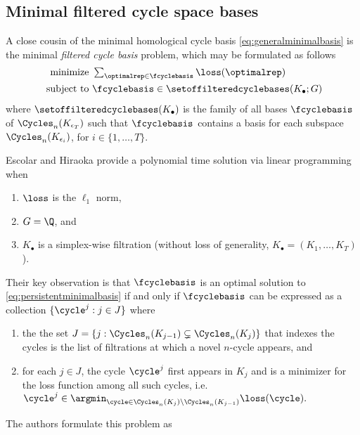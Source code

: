 \subsection{Minimal filtered cycle space bases}

A close cousin of the minimal homological cycle basis \pr \eqref{eq:generalminimalbasis} is the minimal \emph{filtered cycle basis} problem, which may be formulated as  follows
\begin{align}
   \begin{split}
    \text{minimize } & \textstyle \sum_{\optimalrep \in \fcyclebasis} \loss(\optimalrep) \\
    \text{ subject to } & \fcyclebasis \in \setoffilteredcyclebases(K_\bullet ; G)
   \end{split}
   \label{eq:filteredminimalbasis}
\end{align}
where $\setoffilteredcyclebases(K_\bullet)$ is the family of all bases $\fcyclebasis$ of $\Cycles_n(K_{\epsilon_T})$ such that $\fcyclebasis$ contains a basis for each  subspace $\Cycles_n(K_{\epsilon_i})$, for $i \in \{1, \ldots, T\}$. %

Escolar and Hiraoka \cite{Escolar2016} provide a polynomial time solution via linear programming when
    \begin{enumerate}
        \item $\loss$ is the $\ell_1$ norm,
        \item $G = \Q$, and
        \item $K_\bullet$ is a simplex-wise filtration (without loss of generality, $K_\bullet = (K_1, \ldots, K_T)$).
    \end{enumerate}
    
Their key observation is that $\fcyclebasis$ is an optimal solution to \pr \eqref{eq:persistentminimalbasis} if and only if $\fcyclebasis$ can be expressed as a collection $\{\cycle^j : j \in J\}$ where  \begin{enumerate}
    \item the the set $J = \{j :  \Cycles_n(K_{j-1}) \subsetneq \Cycles_n(K_j) \}$ that indexes the cycles is the list of filtrations at which a novel $n$-cycle appears, and
    \item for each $j \in J$, the cycle $\cycle^j$ first appears in $K_j$ and is a minimizer for the loss function among all such cycles, i.e. $\cycle^j \in \argmin_{\cycle \in \Cycles_n(K_j) \backslash \Cycles_n(K_{j-1})} \loss(\cycle).$
\end{enumerate}
The authors formulate this problem as 

